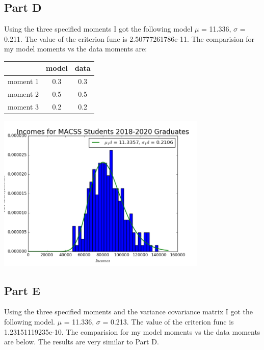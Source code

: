 \documentclass{article}
\begin{document}
\subsection*{Part D}
Using the three specified moments I got the following model $\mu$ = 11.336, $\sigma$ = 0.211.  The value of the criterion func is 2.50777261786e-11.  The comparision for my model moments vs the data moments are:

\begin{center}
  \begin{tabular}{ l | c | c }
    \hline
     & model & data \\ \hline
    moment 1 & 0.3 & 0.3 \\ \hline
    moment 2 & 0.5 & 0.5 \\ \hline
    moment 3 & 0.2 & 0.2 \\
    \hline
  \end{tabular}
\end{center}
\begin{center}\includegraphics[width=100mm]{images/1d.png}\end{center}



\subsection*{Part E}
Using the three specified moments and the variance covariance matrix I got the following model.  $\mu$ = 11.336, $\sigma$ = 0.213.  The value of the criterion func is 1.23151119235e-10.  The comparision for my model moments vs the data moments are below.  The results are very similar to Part D.
\end{document}
